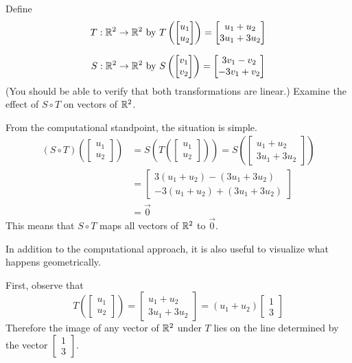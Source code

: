 \documentclass{ximera}
\begin{document}
\begin{example}\label{ex:transcomp} Define $$T:\mathbb{R}^2\rightarrow \mathbb{R}^2 \text{ }\text{by}\text{ } T\left(\begin{bmatrix}u_1\\u_2\end{bmatrix}\right)=\begin{bmatrix}u_1+u_2\\3u_1+3u_2\end{bmatrix}$$
 
$$S:\mathbb{R}^2\rightarrow \mathbb{R}^2 \text{ }\text{by}\text{ } S\left(\begin{bmatrix}v_1\\v_2\end{bmatrix}\right)=\begin{bmatrix}3v_1-v_2\\-3v_1+v_2\end{bmatrix}$$
(You should be able to verify that both transformations are linear.)  Examine the effect of $S\circ T$ on vectors of $\mathbb{R}^2$.
\begin{explanation}
From the computational standpoint, the situation is simple.
\begin{align*}
(S\circ T)\left(\begin{bmatrix}u_1\\u_2\end{bmatrix}\right)&=S\left(T\left(\begin{bmatrix}u_1\\u_2\end{bmatrix}\right)\right)=S\left(\begin{bmatrix}u_1+u_2\\3u_1+3u_2\end{bmatrix}\right)\\
&=\begin{bmatrix}3(u_1+u_2)-(3u_1+3u_2)\\-3(u_1+u_2)+(3u_1+3u_2)\end{bmatrix}\\
&=\vec{0}
\end{align*}
This means that $S\circ T$ maps all vectors of $\mathbb{R}^2$ to $\vec{0}$. 
 
In addition to the computational approach, it is also useful to visualize what happens geometrically.
 
First, observe that $$T\left(\begin{bmatrix}u_1\\u_2\end{bmatrix}\right)=\begin{bmatrix}u_1+u_2\\3u_1+3u_2\end{bmatrix}=(u_1+u_2)\begin{bmatrix}1\\3\end{bmatrix}$$  Therefore the image of any vector of $\mathbb{R}^2$ under $T$ lies on the line determined by the vector $\begin{bmatrix}1\\3\end{bmatrix}$. 
 

\end{explanation}
\end{example}
\end{document}
